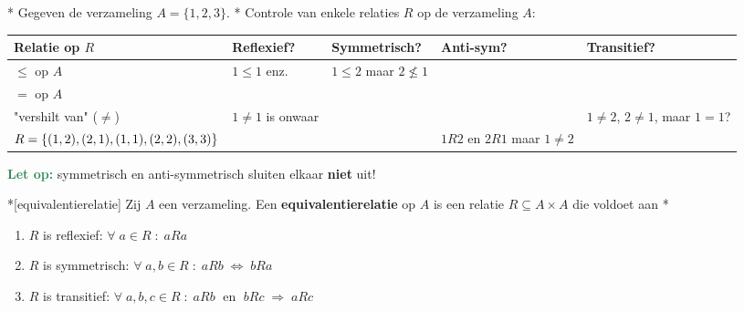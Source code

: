 \begin{niceexample}*
    Gegeven de verzameling $A = \{1,2,3\}$.
    \nextpart[Voorbeeld.]*
    Controle van enkele relaties $R$ op de verzameling $A$:
    \begin{center}
        \renewcommand{\arraystretch}{1.5}
        \begin{tabularx}{\textwidth}{@{} >{\hsize}L >{\hsize}L >{\hsize}L >{\hsize}L >{\hsize}L @{}}
            \textbf{Relatie op $R$} & \textbf{Reflexief?} & \textbf{Symmetrisch?} & \textbf{Anti-sym?} & \textbf{Transitief?} \\
            \hline
            $\le$ op $A$ &  $1 \leq 1$ enz. &  $1 \leq 2$ maar $2 \nleq 1$ &  &  \\
            \thinrule
            $=$ op $A$  &  &  &  &  \\
            \thinrule
            "vershilt van" ($\neq$) &  $1 \neq 1$ is onwaar &  &  &  $1 \neq 2$, $2 \neq 1$, maar $1=1$? \\
            \thinrule
            $R = \{(1,2), (2,1),\newline (1,1), (2,2),\newline (3,3)\}$ &  &  &  $1R2$ en $2R1$ maar $1 \neq 2$ &  \\
            \hline
        \end{tabularx}
    \end{center}
\end{niceexample}

\begin{barbox}[SeaGreen][gray!5]
    \textcolor{SeaGreen}{\textbf{Let op:}} symmetrisch en anti-symmetrisch sluiten elkaar \textbf{niet} uit!
\end{barbox}


\begin{nicedefinition}*[equivalentierelatie]\label{def:L2_equivalentierelatie}
    Zij $A$ een verzameling. Een \textcolor{PineGreen!75!black}{\textbf{equivalentierelatie}} op $A$ is een relatie $R \subseteq A \times A$ die voldoet aan 
    \nextpart[]*
    \begin{enumerate}
        \item $R$ is reflexief: $\forall\; a \in R \;:\; aRa$
        \item $R$ is symmetrisch: $\forall\; a,b \in R \;:\; aRb \;\Leftrightarrow\; bRa$
        \item $R$ is transitief: $\forall\; a,b,c \in R \;:\; aRb \;\text{ en }\; bRc \;\Rightarrow\; aRc$
    \end{enumerate}
\end{nicedefinition}


